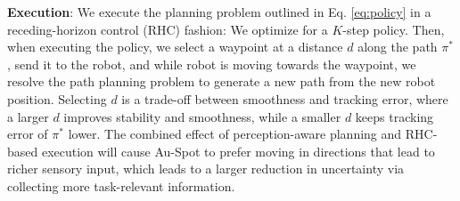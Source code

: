 \documentclass[letterpaper, 10pt, conference]{ieeeconf}      %
\newcommand{\ph}[1]{{\textbf{#1}:}} %
\newcommand{\rev}[1]{{\color{blue}#1}} %
\begin{document}



  

\ph{Execution}
We execute the planning problem outlined in Eq. \ref{eq:policy} in a receding-horizon control (RHC) fashion: We optimize for a $K$-step policy. Then, when executing the policy, we select a waypoint at a distance $d$ along the path $\pi^*$, send it to the robot, and while robot is moving towards the waypoint, we resolve the path planning problem to generate a new path from the new robot position. Selecting $d$ is a trade-off between smoothness and tracking error, where a larger $d$ improves stability and smoothness, while a smaller $d$ keeps tracking error of $\pi^*$ lower. The combined effect of perception-aware planning and RHC-based execution will cause Au-Spot to prefer moving in directions that lead to richer sensory input, which leads to a larger reduction in uncertainty via collecting more task-relevant information.


\end{document}
